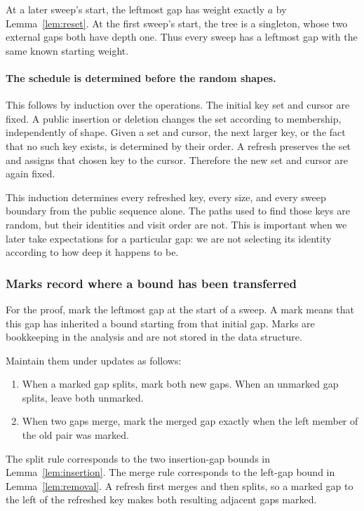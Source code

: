 \documentclass[11pt,a4paper]{article}
\theoremstyle{readable}
\begin{document}
At a later sweep's start, the leftmost gap has weight exactly $a$ by
Lemma~\ref{lem:reset}. At the first sweep's start, the tree is a
singleton, whose two external gaps both have depth one. Thus every
sweep has a leftmost gap with the same known starting weight.

\paragraph{The schedule is determined before the random shapes.}
This follows by induction over the operations. The initial key set
and cursor are fixed. A public insertion or deletion changes the set
according to membership, independently of shape. Given a set and cursor,
the next larger key, or the fact that no such key exists, is determined
by their order. A refresh preserves the set and assigns that chosen
key to the cursor. Therefore the new set and cursor are again fixed.

This induction determines every refreshed key, every size, and every
sweep boundary from the public sequence alone. The paths used to find
those keys are random, but their identities and visit order are not.
This is important when we later take expectations for a particular gap:
we are not selecting its identity according to how deep it happens to be.

\subsubsection*{Marks record where a bound has been transferred}
For the proof, mark the leftmost gap at the start of a sweep. A mark
means that this gap has inherited a bound starting from that initial
gap. Marks are bookkeeping in the analysis and are not stored in the
data structure.

Maintain them under updates as follows:
\begin{enumerate}
  \item When a marked gap splits, mark both new gaps. When an
        unmarked gap splits, leave both unmarked.
  \item When two gaps merge, mark the merged gap exactly when the
        left member of the old pair was marked.
\end{enumerate}
The split rule corresponds to the two insertion-gap bounds in
Lemma~\ref{lem:insertion}. The merge rule corresponds to the
left-gap bound in Lemma~\ref{lem:removal}. A refresh first merges
and then splits, so a marked gap to the left of the refreshed key
makes both resulting adjacent gaps marked.
\end{document}
